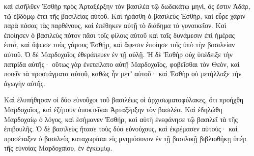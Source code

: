 {καὶ εἰσῆλθεν Ἐσθὴρ πρὸς Ἀρταξέρξην τὸν βασιλέα τῷ δωδεκάτῳ μηνὶ, ὅς ἐστιν Ἀδάρ, τῷ ἑβδόμῳ ἔτει τῆς βασιλείας αὐτοῦ.
Καὶ ἠράσθη ὁ βασιλεὺς Ἐσθὴρ, καὶ εὗρε χάριν παρὰ πάσας τὰς παρθένους, καὶ ἐπέθηκεν αὐτῇ τὸ διάδημα τὸ γυναικεῖον.
Καὶ ἐποίησεν ὁ βασιλεὺς πότον πᾶσι τοῖς φίλοις αὐτοῦ καὶ ταῖς δυνάμεσιν ἐπὶ ἡμέρας ἑπτά, καὶ ὕψωσε τοὺς γάμους Ἐσθήρ, καὶ ἄφεσιν ἐποίησε τοῖς ὑπὸ τὴν βασιλείαν αὐτοῦ.
Ὁ δὲ Μαρδοχαῖος ἐθεράπευεν ἐν τῇ αὐλῇ.
Ἡ δὲ Ἐσθὴρ οὐχ ὑπέδειξε τὴν πατρίδα αὐτῆς· οὕτως γὰρ ἐνετείλατο αὐτῇ Μαρδοχαῖος, φοβεῖσθαι τὸν Θεὸν, καὶ ποιεῖν τὰ προστάγματα αὐτοῦ, καθὼς ἦν μετʼ αὐτοῦ· καὶ Ἐσθὴρ οὐ μετήλλαξε τὴν ἀγωγὴν αὐτῆς.
\par }{\PP {}Καὶ ἐλυπήθησαν οἱ δύο εὐνοῦχοι τοῦ βασιλέως οἱ ἀρχισωματοφύλακες, ὅτι προήχθη Μαρδοχαῖος, καὶ ἐζήτουν ἀποκτεῖναι Ἀρταξέρξην τὸν βασιλέα.
Καὶ ἐδηλώθη Μαρδοχαίῳ ὁ λόγος, καὶ ἐσήμανεν Ἐσθήρ, καὶ αὐτὴ ἐνεφάνησε τῷ βασιλεῖ τὰ τῆς ἐπιβουλῆς.
Ὁ δὲ βασιλεὺς ἤτασε τοὺς δύο εὐνούχους, καὶ ἐκρέμασεν αὐτούς· καὶ προσέταξεν ὁ βασιλεὺς καταχωρίσαι εἰς μνημόσυνον ἐν τῇ βασιλικῇ βιβλιοθήκῃ ὑπὲρ τῆς εὐνοίας Μαρδοχαίου, ἐν ἐγκωμίῳ.

}
